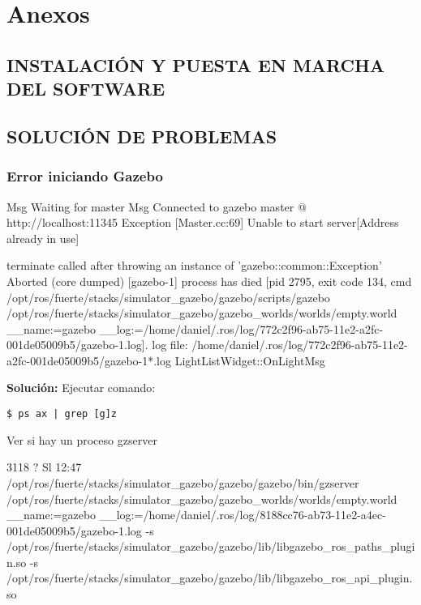 \documentclass[10pt, a4paper]{report}
\begin{document}

\part{Anexos}

\appendix

\chapter{INSTALACIÓN Y PUESTA EN MARCHA DEL SOFTWARE}

\chapter{SOLUCIÓN DE PROBLEMAS}

\section{Error iniciando Gazebo}

\begin{spverbatim}
Msg Waiting for master
Msg Connected to gazebo master @ http://localhost:11345
Exception [Master.cc:69] Unable to start server[Address already in use]


terminate called after throwing an instance of 'gazebo::common::Exception'
Aborted (core dumped)
[gazebo-1] process has died [pid 2795, exit code 134, cmd /opt/ros/fuerte/stacks/simulator_gazebo/gazebo/scripts/gazebo /opt/ros/fuerte/stacks/simulator_gazebo/gazebo_worlds/worlds/empty.world __name:=gazebo __log:=/home/daniel/.ros/log/772c2f96-ab75-11e2-a2fc-001de05009b5/gazebo-1.log].
log file: /home/daniel/.ros/log/772c2f96-ab75-11e2-a2fc-001de05009b5/gazebo-1*.log
LightListWidget::OnLightMsg
\end{spverbatim}

\textbf{Solución: }
Ejecutar comando:
\begin{verbatim}
$ ps ax | grep [g]z
\end{verbatim}

Ver si hay un proceso gzserver

\begin{spverbatim}
 3118 ?        Sl    12:47
 /opt/ros/fuerte/stacks/simulator_gazebo/gazebo/gazebo/bin/gzserver 
 /opt/ros/fuerte/stacks/simulator_gazebo/gazebo_worlds/worlds/empty.world __name:=gazebo __log:=/home/daniel/.ros/log/8188cc76-ab73-11e2-a4ec-001de05009b5/gazebo-1.log -s /opt/ros/fuerte/stacks/simulator_gazebo/gazebo/lib/libgazebo_ros_paths_plugin.so -s /opt/ros/fuerte/stacks/simulator_gazebo/gazebo/lib/libgazebo_ros_api_plugin.so
\end{spverbatim}
\end{document}
